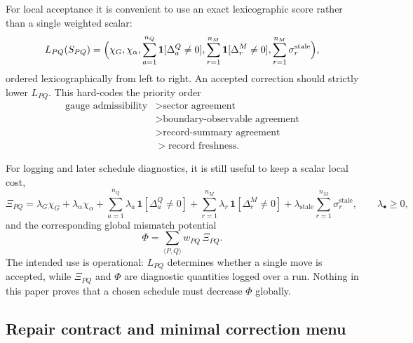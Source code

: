\documentclass[11pt]{article}
\begin{document}
For local acceptance it is convenient to use an exact lexicographic score rather than a single
weighted scalar:
\begin{equation}
L_{PQ}(S_{PQ})
=
\Bigl(
\chi_G,
\chi_{\alpha},
\sum_{a=1}^{n_Q}\mathbf 1[\Delta_a^{Q}\neq 0],
\sum_{r=1}^{n_M}\mathbf 1[\Delta_r^{M}\neq 0],
\sum_{r=1}^{n_M}\sigma_r^{\mathrm{stale}}
\Bigr),
\end{equation}
ordered lexicographically from left to right. An accepted correction should strictly
lower $L_{PQ}$. This hard-codes the priority order
\begin{equation}
\begin{aligned}
\text{gauge admissibility}
&>\text{sector agreement}\\
&>\text{boundary-observable agreement}\\
&>\text{record-summary agreement}\\
&>\text{record freshness}.
\end{aligned}
\end{equation}

For logging and later schedule diagnostics, it is still useful to keep a scalar local cost,
\begin{equation}
\Xi_{PQ}
=
\lambda_G\chi_G
+
\lambda_{\alpha}\chi_{\alpha}
+
\sum_{a=1}^{n_Q}\lambda_a\,\mathbf 1[\Delta_a^{Q}\neq 0]
+
\sum_{r=1}^{n_M}\lambda_r\,\mathbf 1[\Delta_r^{M}\neq 0]
+
\lambda_{\mathrm{stale}}\sum_{r=1}^{n_M}\sigma_r^{\mathrm{stale}},
\qquad \lambda_{\bullet}\ge 0,
\end{equation}
and the corresponding global mismatch potential
\begin{equation}
\Phi=\sum_{\langle P,Q\rangle} w_{PQ}\,\Xi_{PQ}.
\end{equation}
The intended use is operational: $L_{PQ}$ determines whether a single move is accepted, while
$\Xi_{PQ}$ and $\Phi$ are diagnostic quantities logged over a run. Nothing in this paper proves
that a chosen schedule must decrease $\Phi$ globally.

\subsection{Repair contract and minimal correction menu}
\end{document}
